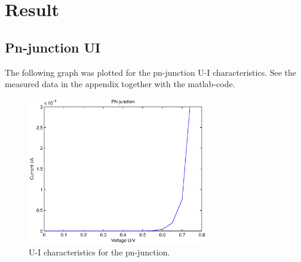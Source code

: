 \documentclass[a4paper]{article}
\begin{document}
\section{Result}
\subsection{Pn-junction UI}
The following graph was plotted for the pn-junction U-I characteristics. See the measured data in the appendix together with the matlab-code. 
\begin{figure}[H]
	\centering
	\includegraphics[width=0.7\textwidth]{pn_ui.eps}
	\caption{U-I characteristics for the pn-junction.}
	\label{pn_ui}
\end{figure}
\end{document}
